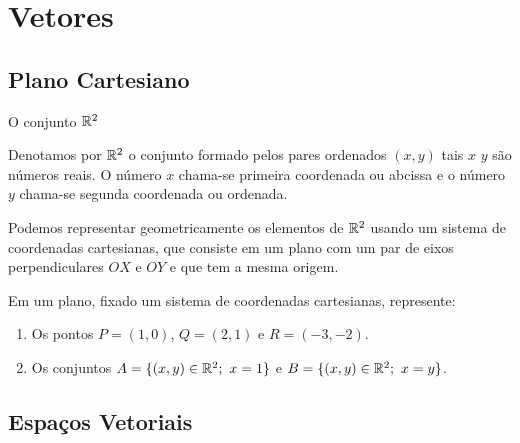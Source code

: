 \section{Vetores}

\subsection*{Plano Cartesiano}
\begin{frame}[label=vetores]{O conjunto $\mathbb{R}^2$}

Denotamos por   $\mathbb{R}^2$ o conjunto formado pelos {\color{blue}pares ordenados} $(x,y)$ tais $x$ $y$ são números reais. O número $x$ chama-se {\color{blue}primeira coordenada ou abcissa} e o número $y$ chama-se {\color{blue}segunda coordenada ou ordenada}. 
\medskip

Podemos representar geometricamente os elementos de $\mathbb{R}^2$ usando um {\color{blue}sistema de coordenadas cartesianas}, que consiste em um plano com um par de eixos perpendiculares $OX$ e $OY$ e que tem a mesma origem.

\begin{exe}
Em um plano, fixado um sistema de coordenadas cartesianas, represente:
\begin{enumerate}
\item Os pontos $P=(1,0)$, $Q=(2,1)$ e $R=(-3,-2)$.
\item Os conjuntos $A=\{(x,y)\in \R^2;\ x=1\}$ e $B=\{(x,y)\in \R^2;\ x=y\}$.
\end{enumerate}
\end{exe}

\end{frame}

\subsection*{Espaços Vetoriais}

